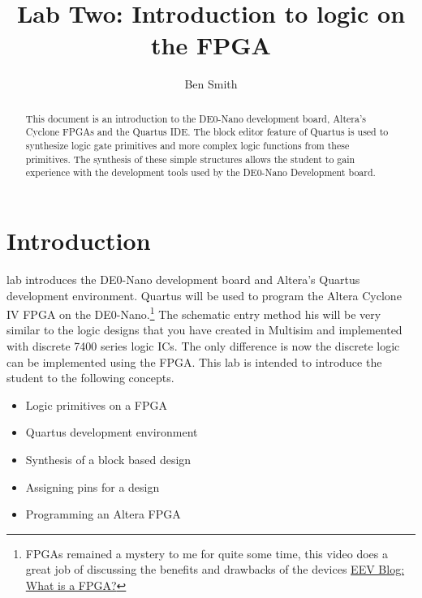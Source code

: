 \title{Lab Two: Introduction to logic on the FPGA}
\author{Ben Smith}



\maketitle

  \begin{abstract}
    This document is an introduction to the DE0-Nano development board, Altera's Cyclone FPGAs and the Quartus IDE. The block editor feature of Quartus is used to synthesize logic gate primitives and more complex logic functions from these primitives. The synthesis of these simple structures allows the student to gain experience with the development tools used by the DE0-Nano Development board.
  \end{abstract}

  \section{Introduction}
     lab introduces the DE0-Nano development board and Altera's Quartus development environment. Quartus will be used to program the Altera Cyclone IV FPGA on the DE0-Nano.\footnote{FPGAs remained a mystery to me for quite some time, this video does a great job of discussing the benefits and drawbacks of the devices \href{https://www.youtube.com/watch?v=gUsHwi4M4xE}{EEV Blog: What is a FPGA?}}  The schematic entry method his will be very similar to the logic designs that you have created in Multisim and implemented with discrete 7400 series logic ICs. The only difference is now the discrete logic can be implemented using the FPGA. This lab is intended to introduce the student to the following concepts.
    \begin{itemize}
       \item Logic primitives on a FPGA
       \item Quartus development environment
       \item Synthesis of a block based design
       \item Assigning pins for a design
       \item Programming an Altera FPGA
    \end{itemize}

